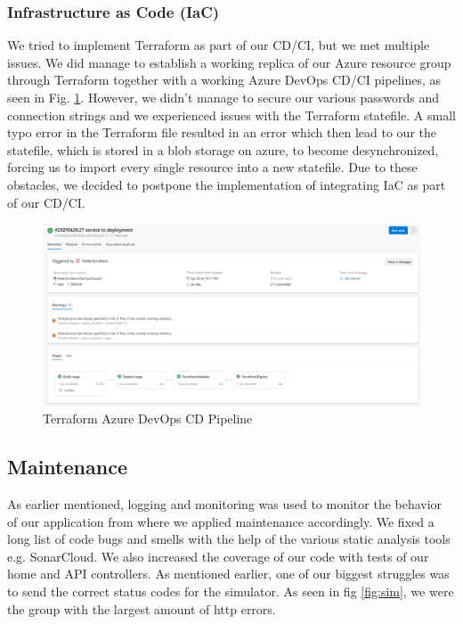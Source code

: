 \documentclass{article}
\begin{document}
    \subsubsection{Infrastructure as Code (IaC)}
    We tried to implement Terraform as part of our CD/CI, but we met multiple issues. We did manage to establish a working replica of our Azure resource group through Terraform together with a working Azure DevOps CD/CI pipelines, as seen in Fig. \ref{fig:terr}. However, we didn't manage to secure our various passwords and connection strings and we experienced issues with the Terraform statefile. A small typo error in the Terraform file resulted in an error which then lead to our the statefile, which is stored in a blob storage on azure, to become desynchronized, forcing us to import every single resource into a new statefile. Due to these obstacles, we decided to postpone the implementation of integrating IaC as part of our CD/CI. 
    \begin{figure}[H]
    \centering
    \includegraphics[width=1\textwidth]{images/terrCDCI.png}
    \caption{\label{fig:terr} Terraform Azure DevOps CD Pipeline}
    \end{figure}
        
\newpage
\subsection{Maintenance}
As earlier mentioned, logging and monitoring was used to monitor the behavior of our application from where we applied maintenance accordingly. We fixed a long list of code bugs and smells with the help of the various static analysis tools e.g. SonarCloud. We also increased the coverage of our code with tests of our home and API controllers.  
As mentioned earlier, one of our biggest struggles was to send the correct status codes for the simulator. As seen in fig \ref{fig:sim}, we were the group with the largest amount of http errors. 
\end{document}
